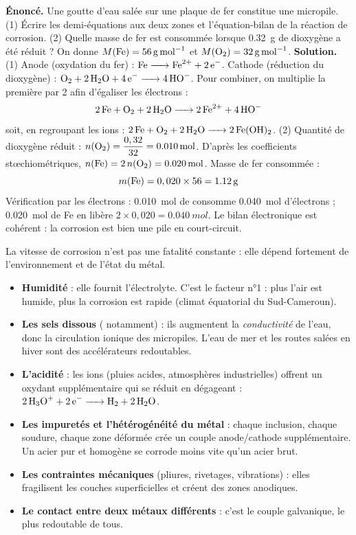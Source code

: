 \documentclass[11pt]{article}
\newcommand{\cle}[1]{{\popxbold\color{popdark}#1}}
\newcounter{popsec}
\newcounter{popsub}
\newcommand{\courssub}[1]{%
  \stepcounter{popsub}%
  \par\vspace{9pt}\noindent{\popxbold\fontsize{11.5}{13}\selectfont\color{popink}{\color{poporange}\thepopsec.\thepopsub}\hspace{6pt}#1}\par\nopagebreak\vspace{4pt}
}
\begin{document}
\begin{exoresolu}
\textbf{Énoncé.} Une goutte d'eau salée sur une plaque de fer constitue une micropile. (1) Écrire les demi-équations aux deux zones et l'équation-bilan de la réaction de corrosion. (2) Quelle masse de fer est consommée lorsque \SI{0,32}{g} de dioxygène a été réduit ? On donne $M(\ce{Fe}) = \SI{56}{g.mol^{-1}}$ et $M(\ce{O2}) = \SI{32}{g.mol^{-1}}$.
\tcblower
\textbf{Solution.} (1) Anode (oxydation du fer) : $\ce{Fe -> Fe^{2+} + 2 e-}$. Cathode (réduction du dioxygène) : $\ce{O2 + 2 H2O + 4 e- -> 4 HO-}$. Pour combiner, on multiplie la première par 2 afin d'égaliser les électrons :
\[ \ce{2 Fe + O2 + 2 H2O -> 2 Fe^{2+} + 4 HO-} \]
soit, en regroupant les ions : $\ce{2 Fe + O2 + 2 H2O -> 2 Fe(OH)2}$.
(2) Quantité de dioxygène réduit : $n(\ce{O2}) = \dfrac{0,32}{32} = \SI{0,010}{mol}$. D'après les coefficients stœchiométriques, $n(\ce{Fe}) = 2\,n(\ce{O2}) = \SI{0,020}{mol}$. Masse de fer consommée :
\[ m(\ce{Fe}) = 0,020 \times 56 = \SI{1,12}{g} \]
Vérification par les électrons : \SI{0,010}{mol} de  consomme \SI{0,040}{mol} d'électrons ; \SI{0,020}{mol} de Fe en libère $2 \times 0,020 = \SI{0,040}{mol}$. Le bilan électronique est cohérent : la corrosion est bien une pile en court-circuit.
\end{exoresolu}

\courssub{Facteurs favorisants la corrosion}

La vitesse de corrosion n'est pas une fatalité constante : elle dépend fortement de l'environnement et de l'état du métal.

\begin{itemize}
\item \textbf{Humidité} : elle fournit l'électrolyte. C'est le facteur n°1 : plus l'air est humide, plus la corrosion est rapide (climat équatorial du Sud-Cameroun).
\item \textbf{Les sels dissous} ( notamment) : ils augmentent la \emph{conductivité} de l'eau, donc la circulation ionique des micropiles. L'eau de mer et les routes salées en hiver sont des accélérateurs redoutables.
\item \textbf{L'acidité} : les ions  (pluies acides, atmosphères industrielles) offrent un oxydant supplémentaire qui se réduit en dégageant  : $\ce{2 H3O+ + 2 e- -> H2 + 2 H2O}$.
\item \textbf{Les impuretés et l'hétérogénéité du métal} : chaque inclusion, chaque soudure, chaque zone déformée crée un couple anode/cathode supplémentaire. Un acier pur et homogène se corrode moins vite qu'un acier brut.
\item \textbf{Les contraintes mécaniques} (pliures, rivetages, vibrations) : elles fragilisent les couches superficielles et créent des zones anodiques.
\item \textbf{Le contact entre deux métaux différents} : c'est le \cle{couple galvanique}, le plus redoutable de tous.
\end{itemize}
\end{document}
